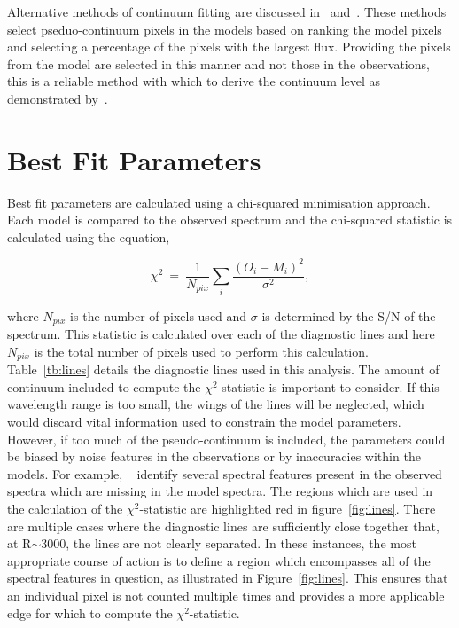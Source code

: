Alternative methods of continuum fitting are discussed in~\cite{2010MNRAS.407.1203D} and~\cite{2011A&A...527A..50E}.
These methods select pseduo-continuum pixels in the models based on ranking the model pixels and selecting a percentage of the pixels with the largest flux.
Providing the pixels from the model are selected in this manner and not those in the observations, this is a reliable method with which to derive the continuum level as demonstrated by~\cite{2015ApJ...806...21D}.

\section{Best Fit Parameters} %
\label{sub:best_fit_parameters}

Best fit parameters are calculated using a chi-squared minimisation approach.
Each model is compared to the observed spectrum
and the chi-squared statistic is calculated using the equation,

\begin{equation}
    \chi^{2}~=~\frac{1}{N_{pix}}\sum\limits_{i}{\frac{(O_{i} - M_{i})^{2}}{\sigma^{2}}},
\end{equation}

where $N_{pix}$ is the number of pixels used and
$\sigma$ is determined by the S/N of the spectrum.
This statistic is calculated over each of the diagnostic lines and here $N_{pix}$ is the total number of pixels used to perform this calculation.
Table~\ref{tb:lines} details the diagnostic lines used in this analysis.
The amount of continuum included to compute the $\chi^{2}$-statistic is important to consider.
If this wavelength range is too small, the wings of the lines will be neglected,
which would discard vital information used to constrain the model parameters.
However, if too much of the pseudo-continuum is included, the parameters could be biased by noise features in the observations or by inaccuracies within the models.
For example,
~\cite{2014PhDT.........G} identify several spectral features present in the observed spectra which are missing in the model spectra.
The regions which are used in the calculation of the $\chi^{2}$-statistic are highlighted red in
figure~\ref{fig:lines}.
There are multiple cases where the diagnostic lines are sufficiently close together that, at R$\sim$3000,
the lines are not clearly separated.
In these instances, the most appropriate course of action is to define a region which encompasses all of the spectral features in question,
as illustrated in Figure~\ref{fig:lines}.
This ensures that an individual pixel is not counted multiple times and provides a more applicable edge for which to compute the $\chi^{2}$-statistic.

